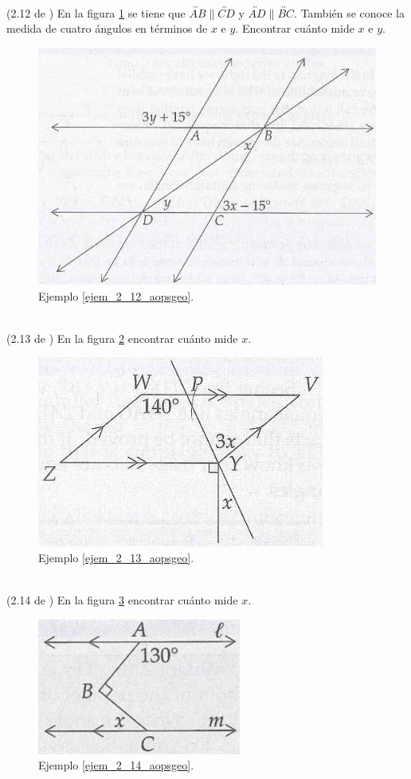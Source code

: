 \begin{ejemplo}{\ \\}
	\label{ejem_2_12_aopsgeo} (2.12 de \cite{Aops_Geometria}) En la figura \ref{2_12_aopsgeo} se tiene que $\overleftrightarrow{AB}\parallel \overleftrightarrow{CD}$ y $\overleftrightarrow{AD}\parallel \overleftrightarrow{BC}$. También se conoce la medida de cuatro ángulos en términos de $x$ e $y$. Encontrar cuánto mide $x$ e $y$.
	\begin{figure}[H]
		\centering
		\includegraphics[width=0.6\linewidth]{Geometria/imgs/2_12_aopsgeo}
		\caption{Ejemplo \ref{ejem_2_12_aopsgeo}.}
		\label{2_12_aopsgeo}
	\end{figure}
\end{ejemplo}

\begin{ejemplo}{\ \\}
	\label{ejem_2_13_aopsgeo} (2.13 de \cite{Aops_Geometria}) En la figura \ref{2_13_aopsgeo} encontrar cuánto mide $x$.
	\begin{figure}[H]
		\centering
		\includegraphics[width=0.5\linewidth]{Geometria/imgs/2_13_aopsgeo}
		\caption{Ejemplo \ref{ejem_2_13_aopsgeo}.}
		\label{2_13_aopsgeo}
	\end{figure}
\end{ejemplo}

\begin{ejemplo}{\ \\}
	\label{ejem_2_14_aopsgeo} (2.14 de \cite{Aops_Geometria}) En la figura \ref{2_14_aopsgeo} encontrar cuánto mide $x$.
	\begin{figure}[H]
		\centering
		\includegraphics[width=0.4\linewidth]{Geometria/imgs/2_14_aopsgeo}
		\caption{Ejemplo \ref{ejem_2_14_aopsgeo}.}
		\label{2_14_aopsgeo}
	\end{figure}
\end{ejemplo}


